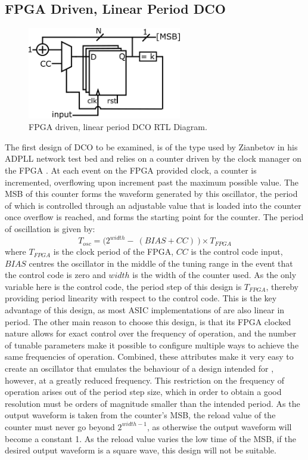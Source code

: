 \subsection{\acs{FPGA} Driven, Linear Period \acs{DCO}}
\begin{figure}[h]
	\centering
	\includegraphics[width=0.6\textwidth]{../osc1}
	\caption{\acs{FPGA} driven, linear period \acs{DCO} \acs{RTL} Diagram.}
	\label{fig:osc1}
\end{figure}
The first design of \ac{DCO} to be examined, is of the type used by Zianbetov in his \ac{ADPLL} network test bed and relies on a counter driven by the clock manager on the \ac{FPGA} \cite{zianbetov2013phd}. At each event on the \ac{FPGA} provided clock, a counter is incremented, overflowing upon increment past the maximum possible value. The \ac{MSB} of this counter forms the waveform generated by this oscillator, the period of which is controlled through an adjustable value that is loaded into the counter once overflow is reached, and forms the starting point for the counter. The period of oscillation is given by:
\begin{equation}
	T_{osc} = \big(2^{width} -~(BIAS+CC)~\big)\times T_{FPGA}
\end{equation}
where $T_{FPGA}$ is the clock period of the \ac{FPGA}, $CC$ is the control code input, $BIAS$ centres the oscillator in the middle of the tuning range in the event that the control code is zero and $width$ is the width of the counter used. As the only variable here is the control code, the period step of this design is $T_{FPGA}$, thereby providing period linearity with respect to the control code. This is the key advantage of this design, as most \ac{ASIC} implementations of  are also linear in period. The other main reason to choose this design, is that its \ac{FPGA} clocked nature allows for exact control over the frequency of operation, and the number of tunable parameters make it possible to configure multiple ways to achieve the same frequencies of operation. Combined, these attributes make it very easy to create an oscillator that emulates the behaviour of a design intended for , however, at a greatly reduced frequency. This restriction on the frequency of operation arises out of the period step size, which in order to obtain a good resolution must be orders of magnitude smaller than the intended period. As the output waveform is taken from the counter's \ac{MSB}, the reload value of the counter must never go beyond $2^{width-1}$, as otherwise the output waveform will become a constant 1. As the reload value varies the low time of the \ac{MSB}, if the desired output waveform is a square wave, this design will not be suitable.


